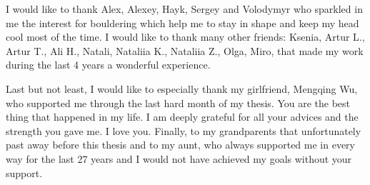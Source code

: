 I would like to thank Alex, Alexey, Hayk, Sergey and Volodymyr who sparkled in me the interest for bouldering which help me to stay in shape and keep my head cool most of the time. I would like to thank many other friends: Ksenia, Artur L., Artur T., Ali H., Natali, Nataliia K., Nataliia Z., Olga, Miro, that made my work during the last 4 years a wonderful experience.

Last but not least, I would like to especially thank my girlfriend, Mengqing Wu, who supported me through the last hard month of my thesis. You are the best thing that happened in my life. I am deeply grateful for all your advices and the strength you gave me. I love you. Finally, to my grandparents that unfortunately past away before this thesis and to my aunt, who always supported me in every way for the last 27 years and I would not have achieved my goals without your support.
